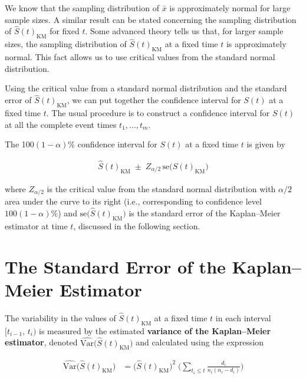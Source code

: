 \documentclass[
]{report}
\begin{document}
We know that the sampling distribution of \(\bar x\) is approximately normal for large sample sizes. A similar result can be stated concerning the sampling distribution of \(\hat S(t)_{\mathrm{KM}}\) for fixed \(t\). Some advanced theory tells us that, for larger sample sizes, the sampling distribution of \(\hat S(t)_{\mathrm{KM}}\) at a fixed time \(t\) is approximately normal. This fact allows us to use critical values from the standard normal distribution.

Using the critical value from a standard normal distribution and the standard error of \(\hat S(t)_{\mathrm{KM}}\), we can put together the confidence interval for \(S(t)\) at a fixed time \(t\). The usual procedure is to construct a confidence interval for \(S(t)\) at all the complete event times \(t_1,\dots,t_m\).

The 100\((1-\alpha)\%\) confidence interval for \(S(t)\) at a fixed time \(t\) is given by

\begin{align}
\hat S(t)_{\mathrm{KM}} \;\pm\; Z_{\alpha/2}\,\mathrm{se}\bigl(\hat S(t)_{\mathrm{KM}}\bigr)
\tag{9.7}
\end{align}

where \(Z_{\alpha/2}\) is the critical value from the standard normal distribution with \(\alpha/2\) area under the curve to its right (i.e., corresponding to confidence level \(100(1-\alpha)\%\)) and \(\mathrm{se}\bigl(\hat S(t)_{\mathrm{KM}}\bigr)\) is the standard error of the Kaplan--Meier estimator at time \(t\), discussed in the following section.

\section*{The Standard Error of the Kaplan--Meier Estimator}\label{the-standard-error-of-the-kaplanmeier-estimator}

The variability in the values of \(\hat S(t)_{\mathrm{KM}}\) at a fixed time \(t\) in each interval \([t_{i-1},\,t_i)\) is measured by the estimated \textbf{variance of the Kaplan--Meier estimator}, denoted \(\widehat{\mathrm{Var}}\bigl(\hat S(t)_{\mathrm{KM}}\bigr)\) and calculated using the expression

\begin{align}
\widehat{\mathrm{Var}}\bigl(\hat S(t)_{\mathrm{KM}}\bigr)
&= \bigl(\hat S(t)_{\mathrm{KM}}\bigr)^2 \;\biggl(\sum_{t_i \le t}\frac{d_i}{n_i(n_i - d_i)}\biggr)
\tag{9.8}
\end{align}
\end{document}
